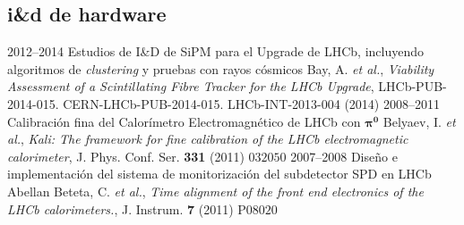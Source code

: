 \subsection{i\&d de hardware}
    \cventry
    {2012--2014}
    {Estudios de I\&D de SiPM para el Upgrade de LHCb, incluyendo algoritmos de \emph{clustering} y pruebas con rayos cósmicos}
    {}
    {Bay, A. \emph{et al.}, \textit{Viability Assessment of a Scintillating Fibre Tracker for the LHCb Upgrade}, LHCb-PUB-2014-015. CERN-LHCb-PUB-2014-015. LHCb-INT-2013-004 (2014)}
    \cventry
    {2008--2011}
    {Calibración fina del Calorímetro Electromagnético de LHCb con $\mathbf{\pi^0}$}
    {}
    {Belyaev, I. \emph{et al.}, \textit{Kali: The framework for fine calibration of the LHCb electromagnetic calorimeter}, J. Phys. Conf. Ser. \textbf{331} (2011) $032050$}
    \cventry
    {2007--2008}
    {Diseño e implementación del sistema de monitorización del subdetector SPD en LHCb}
    {}
    {Abellan Beteta, C. \emph{et al.}, \textit{Time alignment of the front end electronics of the LHCb calorimeters.}, J. Instrum. \textbf{7} (2011) P$08020$}

